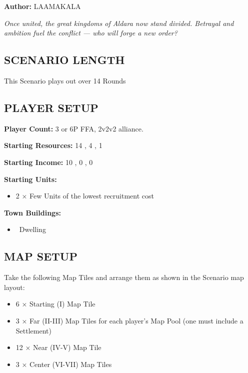 
\begin{multicols*}{2}

\textbf{Author:} LAAMAKALA

\textit{Once united, the great kingdoms of Aldara now stand divided. Betrayal and ambition fuel the conflict — who will forge a new order?}%

\subsection*{\MakeUppercase{Scenario Length}}
This Scenario plays out over 14 Rounds

\subsection*{\MakeUppercase{Player Setup}}
\textbf{Player Count:} 3 or 6P FFA, 2v2v2 alliance. 

\textbf{Starting Resources:} 14 , 4 , 1 

\textbf{Starting Income:} 10 , 0 , 0 

\textbf{Starting Units:}

\begin{itemize}
  \item 2 × Few  Units of the lowest recruitment cost
\end{itemize}

\textbf{Town Buildings:}
\begin{itemize}
  \item \bronze\ Dwelling
\end{itemize}

\subsection*{\MakeUppercase{Map Setup}}
Take the following Map Tiles and arrange them as shown in the Scenario map layout:

\begin{itemize}
  \item 6 × Starting (I) Map Tile
  \item 3 × Far (II-III) Map Tiles for each player's Map Pool (one must include a Settlement)
  \item 12 × Near (IV-V) Map Tile
  \item 3 × Center (VI-VII) Map Tiles
\end{itemize}


\end{multicols*}
